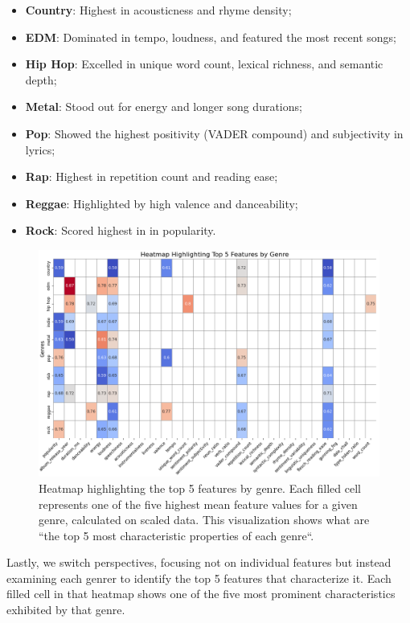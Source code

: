 \begin{itemize}
  \item \textbf{Country}: Highest in acousticness and rhyme density;
  \item \textbf{EDM}: Dominated in tempo, loudness, and featured the most
    recent songs;
  \item \textbf{Hip Hop}: Excelled in unique word count, lexical richness, and
    semantic depth;
  \item \textbf{Metal}: Stood out for energy and longer song durations;
  \item \textbf{Pop}: Showed the highest positivity (VADER compound) and
    subjectivity in lyrics;
  \item \textbf{Rap}: Highest in repetition count and reading ease;
  \item \textbf{Reggae}: Highlighted by high valence and danceability;
  \item \textbf{Rock}: Scored highest in in popularity.
    
\end{itemize}

\begin{center}
\begin{figure}[H]
  \centering
  \includegraphics[width=6in]{img/heatmap_top_feature_values_by_genre.png}
  \caption{Heatmap highlighting the top 5 features by genre. Each filled cell
    represents one of the five highest mean feature values for a given genre,
    calculated on scaled data. This visualization shows what are ``the top 5
    most characteristic properties of each genre``. }
  \label{Figure:dendrogram_spotify_features}
\end{figure}
\end{center}

Lastly, we switch perspectives, focusing not on individual features but instead
examining each genrer to identify the top 5 features that characterize it. Each
filled cell in that heatmap shows one of the five most prominent
characteristics exhibited by that genre.

